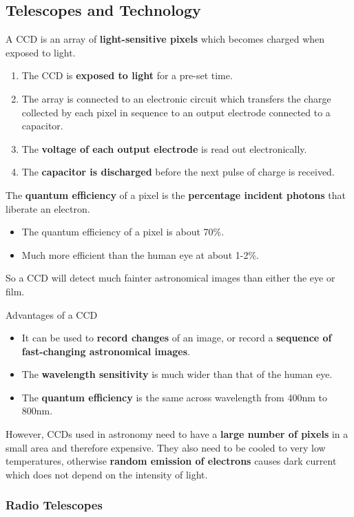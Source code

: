 \subsection{Telescopes and Technology}

A CCD is an array of \textbf{light-sensitive pixels} which becomes charged when exposed to light.
\begin{enumerate}
    \item The CCD is \textbf{exposed to light} for a pre-set time.
    \item The array is connected to an electronic circuit which transfers the charge collected by each pixel in sequence to an output electrode connected to a capacitor.
    \item The \textbf{voltage of each output electrode} is read out electronically.
    \item The \textbf{capacitor is discharged} before the next pulse of charge is received.
\end{enumerate}

The \textbf{quantum efficiency} of a pixel is the \textbf{percentage incident photons} that liberate an electron.
\begin{itemize}
    \item The quantum efficiency of a pixel is about 70\%.
    \item Much more efficient than the human eye at about 1-2\%.
\end{itemize}
So a CCD will detect much fainter astronomical images than either the eye or film.

Advantages of a CCD
\begin{itemize}
    \item It can be used to \textbf{record changes} of an image, or record a \textbf{sequence of fast-changing astronomical images}.
    \item The \textbf{wavelength sensitivity} is much wider than that of the human eye.
    \item The \textbf{quantum efficiency} is the same across wavelength from 400nm to 800nm.
\end{itemize}

However, CCDs used in astronomy need to have a \textbf{large number of pixels} in a small area and therefore expensive. They also need to be cooled to very low temperatures, otherwise \textbf{random emission of electrons} causes dark current which does not depend on the intensity of light.

\subsubsection*{Radio Telescopes}

